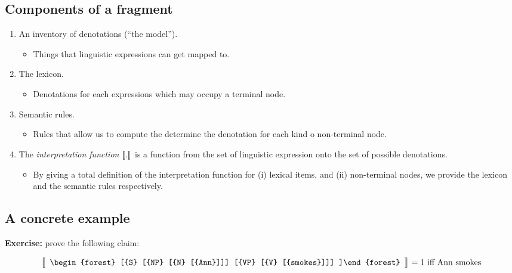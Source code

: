 \documentclass[letterpaper,parskip=half]{scrartcl}
\begin{document}
\subsection{Components of a fragment}
\label{sec:org52d18bb}

\begin{enumerate}
\item An inventory of denotations (``the model'').
\begin{itemize}
\item Things that linguistic expressions can get mapped to.
\end{itemize}
\item The lexicon.
\begin{itemize}
\item Denotations for each expressions which may occupy a terminal node.
\end{itemize}
\item Semantic rules.
\begin{itemize}
\item Rules that allow us to compute the determine the denotation for each kind o non-terminal node.
\end{itemize}

\item The \emph{interpretation function} \(\eval{.}\) is a function from the set of linguistic expression onto the set of possible denotations.
\begin{itemize}
\item By giving a total definition of the interpretation function for (i) lexical items, and (ii) non-terminal nodes, we provide the lexicon and the semantic rules respectively.
\end{itemize}
\end{enumerate}
\subsection{A concrete example}
\label{sec:orgb778941}

\textbf{Exercise:} prove the following claim:

\[\eval*{\begin{array}{c}
\begin{forest}
    [{S}
      [{NP} [{N} [{Ann}]]]
      [{VP} [{V} [{smokes}]]]
    ]\end{forest}
\end{array}} = 1\text{ iff Ann smokes}\]

\printbibliography
\end{document}
